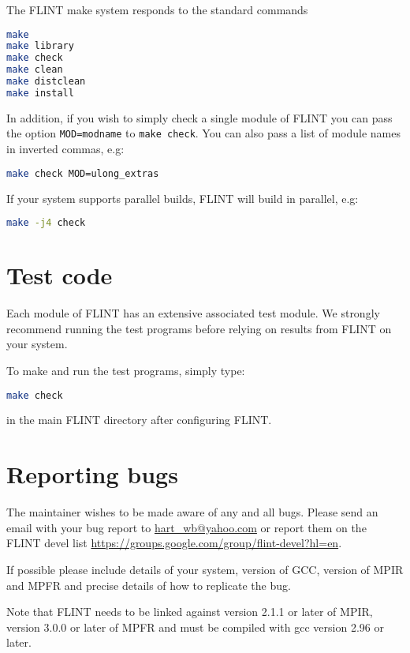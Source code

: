 \documentclass[a4paper,10pt]{book}
\newcommand{\code}{\lstinline}
\begin{document}
The FLINT make system responds to the standard commands
\begin{lstlisting}[language=bash]
make 
make library
make check
make clean
make distclean
make install
\end{lstlisting}

In addition, if you wish to simply check a single module of FLINT you
can pass the option \code{MOD=modname} to \code{make check}. You can 
also pass a list of module names in inverted commas, e.g:

\begin{lstlisting}[language=bash]
make check MOD=ulong_extras
\end{lstlisting}

If your system supports parallel builds, FLINT will build in parallel,
e.g:
\begin{lstlisting}[language=bash]
make -j4 check 
\end{lstlisting}

\chapter{Test code}

Each module of FLINT has an extensive associated test module.  We 
strongly recommend running the test programs before relying on results 
from FLINT on your system. 

To make and run the test programs, simply type:
\begin{lstlisting}[language=bash]
make check
\end{lstlisting}

in the main FLINT directory after configuring FLINT.

\chapter{Reporting bugs}

The maintainer wishes to be made aware of any and all bugs.  Please send an 
email with your bug report to \url{hart_wb@yahoo.com} or report them on the
FLINT devel list \url{https://groups.google.com/group/flint-devel?hl=en}.

If possible please include details of your system, version of GCC, version 
of MPIR and MPFR and precise details of how to replicate the bug.

Note that FLINT needs to be linked against version 2.1.1 or later of MPIR,
version 3.0.0 or later of MPFR and must be compiled with gcc version 2.96 
or later.  
\end{document}
